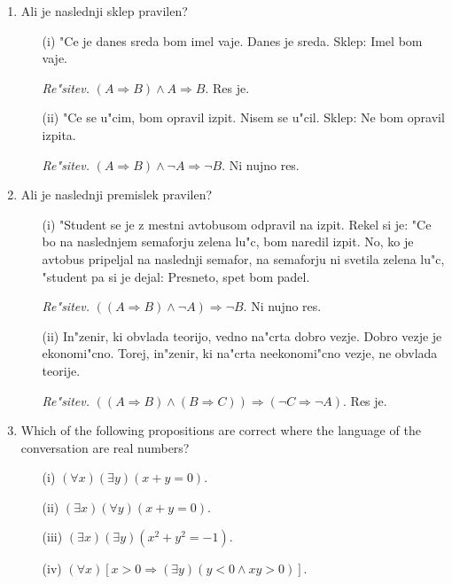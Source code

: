 \documentclass[11pt,paper=b5,footinclude,headinclude]{scrbook} %
\begin{document}
\begin{enumerate}
\item Ali je naslednji sklep pravilen?
\begin{enumerate}
\item[(i)] "Ce je danes sreda bom imel vaje. Danes je sreda. Sklep: Imel bom vaje.

\emph{ Re"sitev.} $(A\Rightarrow B) \wedge A \Rightarrow B$. Res je.

\item[(ii)] "Ce se u"cim, bom opravil izpit. Nisem se u"cil. Sklep: Ne bom opravil izpita.

\emph{ Re"sitev.} $(A\Rightarrow B) \wedge \neg A \Rightarrow \neg B$. Ni nujno res.
\end{enumerate}

\item Ali je naslednji premislek pravilen?
\begin{enumerate}
\item[(i)] "Student se je z mestni avtobusom odpravil na izpit. Rekel si je: "Ce bo na naslednjem semaforju zelena lu"c, bom naredil izpit. No, ko je avtobus pripeljal na naslednji semafor, na semaforju ni svetila zelena lu"c, "student pa si je dejal: Presneto, spet bom padel.

\emph{ Re"sitev.} $((A\Rightarrow B) \wedge \neg A) \Rightarrow \neg B$. Ni nujno res.

\item[(ii)] In"zenir, ki obvlada teorijo, vedno na"crta dobro vezje. Dobro vezje je ekonomi"cno. Torej, in"zenir, ki na"crta neekonomi"cno vezje, ne obvlada teorije. 

\emph{ Re"sitev.} $((A\Rightarrow B) \wedge (B\Rightarrow C)) \Rightarrow (\neg C \Rightarrow \neg A)$. Res je.
\end{enumerate}





\item Which of the following propositions are correct where the language of the conversation are real numbers?
\begin{enumerate}
\item[(i)] $(\forall x)(\exists y)(x+y=0)$.
\item[(ii)] $(\exists x)(\forall y)(x+y=0)$.
\item[(iii)] $(\exists x)(\exists y)(x^2+y^2 =-1)$.
\item[(iv)] $(\forall x)[x>0 \Rightarrow (\exists y)(y<0 \wedge xy>0)]$.
\end{enumerate} 





\end{enumerate}
\end{document}
